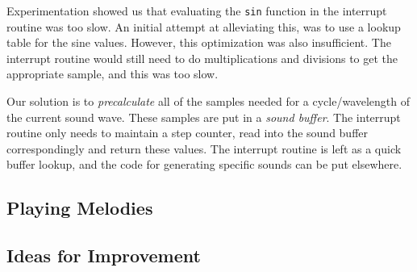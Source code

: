 Experimentation showed us that evaluating the \texttt{sin} function in
the interrupt routine was too slow. An initial attempt at alleviating
this, was to use a lookup table for the sine values. However, this
optimization was also insufficient. The interrupt routine would still
need to do multiplications and divisions to get the appropriate sample,
and this was too slow.

Our solution is to \emph{precalculate} all of the samples needed for a
cycle/wavelength of the current sound wave. These samples are put in a
\emph{sound buffer}. The interrupt routine only needs to maintain a step
counter, read into the sound buffer correspondingly and return these
values. The interrupt routine is left as a quick buffer lookup, and the
code for generating specific sounds can be put elsewhere.



\subsection{Playing Melodies}
\subsection{Ideas for Improvement}
